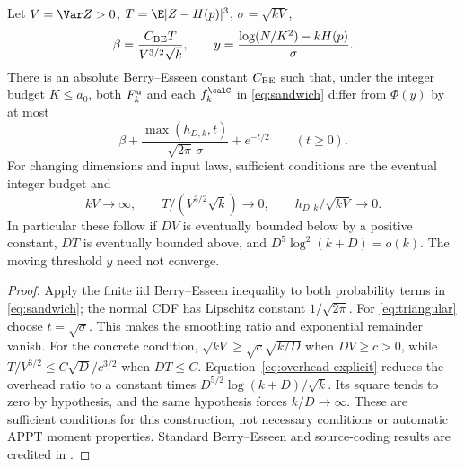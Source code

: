 \begin{corollary}\label{cor:berry}
Let $V=\Var Z>0$, $T=\E|Z-H(p)|^3$, $\sigma=\sqrt{kV}$,
\[
 \beta=\frac{C_{\rm BE}T}{V^{3/2}\sqrt k},\qquad
 y=\frac{\log(N/K^2)-kH(p)}\sigma.
\]
There is an absolute Berry--Esseen constant $C_{\rm BE}$ such that, under the integer budget $K\le a_0$, both $F_k^{\rm u}$ and each $f_k^{\calC}$ in \eqref{eq:sandwich} differ from $\Phi(y)$ by at most
\begin{equation}\label{eq:gaussian-error}
 \beta+\frac{\max(h_{D,k},t)}{\sqrt{2\pi}\,\sigma}+e^{-t/2}
 \qquad(t\ge0).
\end{equation}
For changing dimensions and input laws, sufficient conditions are the eventual integer budget and
\begin{equation}\label{eq:triangular}
 kV\to\infty,\qquad T/(V^{3/2}\sqrt k)\to0,\qquad
 h_{D,k}/\sqrt{kV}\to0.
\end{equation}
In particular these follow if $DV$ is eventually bounded below by a positive constant, $DT$ is eventually bounded above, and $D^5\log^2(k+D)=o(k)$. The moving threshold $y$ need not converge.
\end{corollary}
\begin{proof}
Apply the finite iid Berry--Esseen inequality to both probability terms in \eqref{eq:sandwich}; the normal CDF has Lipschitz constant $1/\sqrt{2\pi}$. For \eqref{eq:triangular} choose $t=\sqrt\sigma$. This makes the smoothing ratio and exponential remainder vanish. For the concrete condition, $\sqrt{kV}\ge\sqrt c\sqrt{k/D}$ when $DV\ge c>0$, while $T/V^{3/2}\le C\sqrt D/c^{3/2}$ when $DT\le C$. Equation~\eqref{eq:overhead-explicit} reduces the overhead ratio to a constant times $D^{5/2}\log(k+D)/\sqrt k$. Its square tends to zero by hypothesis, and the same hypothesis forces $k/D\to\infty$. These are sufficient conditions for this construction, not necessary conditions or automatic APPT moment properties. Standard Berry--Esseen and source-coding results are credited in \cite{shevtsova,hayashi-second}.
\end{proof}
